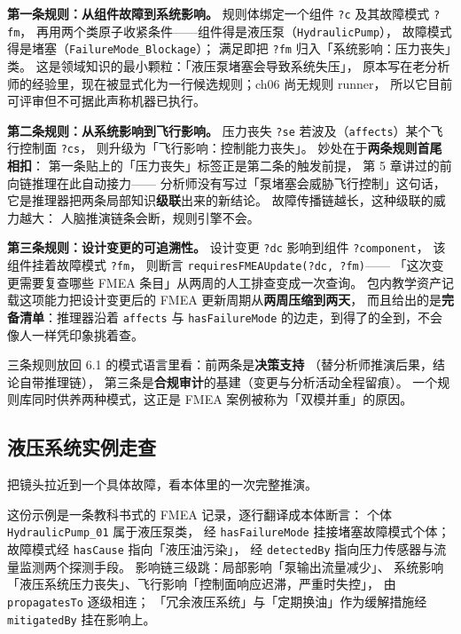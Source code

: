 \textbf{第一条规则：从组件故障到系统影响。}
规则体绑定一个组件 \texttt{?c} 及其故障模式 \texttt{?fm}，
再用两个类原子收紧条件——组件得是液压泵（\texttt{HydraulicPump}），
故障模式得是堵塞（\texttt{FailureMode\_Blockage}）；
满足即把 \texttt{?fm} 归入「系统影响：压力丧失」类。
这是领域知识的最小颗粒：「液压泵堵塞会导致系统失压」，
原本写在老分析师的经验里，现在被显式化为一行候选规则；ch06 尚无规则 runner，
所以它目前可评审但不可据此声称机器已执行。

\textbf{第二条规则：从系统影响到飞行影响。}
压力丧失 \texttt{?se} 若波及（\texttt{affects}）某个飞行控制面 \texttt{?cs}，
则升级为「飞行影响：控制能力丧失」。
妙处在于\textbf{两条规则首尾相扣}：
第一条贴上的「压力丧失」标签正是第二条的触发前提，
第 5 章讲过的前向链推理在此自动接力——
分析师没有写过「泵堵塞会威胁飞行控制」这句话，
它是推理器把两条局部知识\textbf{级联}出来的新结论。
故障传播链越长，这种级联的威力越大：
人脑推演链条会断，规则引擎不会。

\textbf{第三条规则：设计变更的可追溯性。}
设计变更 \texttt{?dc} 影响到组件 \texttt{?component}，
该组件挂着故障模式 \texttt{?fm}，
则断言 \texttt{requiresFMEAUpdate(?dc, ?fm)}——
「这次变更需要复查哪些 FMEA 条目」从两周的人工排查变成一次查询。
包内教学资产记载这项能力把设计变更后的 FMEA 更新周期从\textbf{两周压缩到两天}，
而且给出的是\textbf{完备清单}：推理器沿着 \texttt{affects} 与
\texttt{hasFailureMode} 的边走，到得了的全到，不会像人一样凭印象挑着查。

三条规则放回 6.1 的模式语言里看：前两条是\textbf{决策支持}
（替分析师推演后果，结论自带推理链），
第三条是\textbf{合规审计}的基建（变更与分析活动全程留痕）。
一个规则库同时供养两种模式，这正是 FMEA 案例被称为「双模并重」的原因。

\subsection{液压系统实例走查}

把镜头拉近到一个具体故障，看本体里的一次完整推演。



这份示例是一条教科书式的 FMEA 记录，逐行翻译成本体断言：
个体 \texttt{HydraulicPump\_01} 属于液压泵类，
经 \texttt{hasFailureMode} 挂接堵塞故障模式个体；
故障模式经 \texttt{hasCause} 指向「液压油污染」，
经 \texttt{detectedBy} 指向压力传感器与流量监测两个探测手段。
影响链三级跳：局部影响「泵输出流量减少」、
系统影响「液压系统压力丧失」、飞行影响「控制面响应迟滞，严重时失控」，
由 \texttt{propagatesTo} 逐级相连；
「冗余液压系统」与「定期换油」作为缓解措施经 \texttt{mitigatedBy} 挂在影响上。

